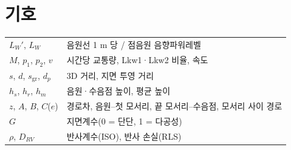 \documentclass[10.5pt,a4paper]{article}
\begin{document}
\section{기호}
\begin{tabularx}{\textwidth}{P{28mm}L}
\toprule
$L_W'$, $L_W$ & 음원선 1 m 당 / 점음원 음향파워레벨 \\
$M$, $p_1$, $p_2$, $v$ & 시간당 교통량, Lkw1·Lkw2 비율, 속도 \\
$s$, $d$, $s_\mathrm{gr}$, $d_p$ & 3D 거리, 지면 투영 거리 \\
$h_s$, $h_r$, $h_m$ & 음원·수음점 높이, 평균 높이 \\
$z$, $A$, $B$, $C$($e$) & 경로차, 음원–첫 모서리, 끝 모서리–수음점, 모서리 사이 경로 \\
$G$ & 지면계수(0 = 단단, 1 = 다공성) \\
$\rho$, $D_{RV}$ & 반사계수(ISO), 반사 손실(RLS) \\
\bottomrule
\end{tabularx}
\end{document}
